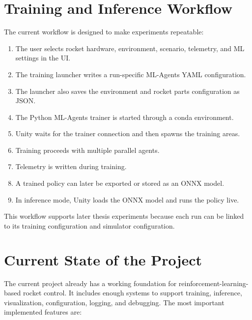 \documentclass[12pt,a4paper]{article}
\begin{document}
\section{Training and Inference Workflow}

The current workflow is designed to make experiments repeatable:

\begin{enumerate}
    \item The user selects rocket hardware, environment, scenario, telemetry, and ML settings in the UI.
    \item The training launcher writes a run-specific ML-Agents YAML configuration.
    \item The launcher also saves the environment and rocket parts configuration as JSON.
    \item The Python ML-Agents trainer is started through a conda environment.
    \item Unity waits for the trainer connection and then spawns the training areas.
    \item Training proceeds with multiple parallel agents.
    \item Telemetry is written during training.
    \item A trained policy can later be exported or stored as an ONNX model.
    \item In inference mode, Unity loads the ONNX model and runs the policy live.
\end{enumerate}

This workflow supports later thesis experiments because each run can be linked to its training configuration and simulator configuration.

\section{Current State of the Project}

The current project already has a working foundation for reinforcement-learning-based rocket control. It includes enough systems to support training, inference, visualization, configuration, logging, and debugging. The most important implemented features are:
\end{document}
